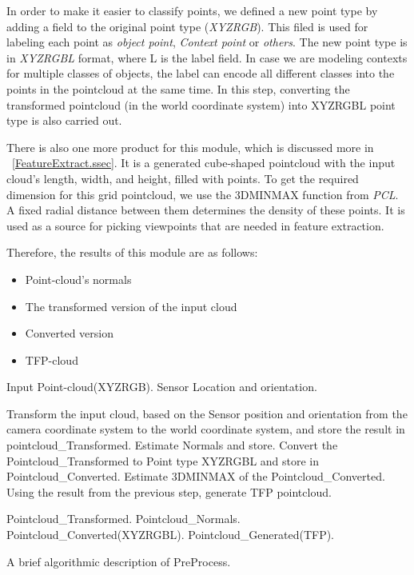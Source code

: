  
 In order to make it easier to classify points, we defined a new point type by adding a field to the original point type ({\it XYZRGB}). This filed is used for labeling each point as {\it object point}, {\it Context point} or {\it others}. The new point type is in {\it XYZRGBL} format, where L is the label field. In case we are modeling contexts for multiple classes of objects, the label can encode all different classes into the points in the pointcloud at the same time. In this step, converting the transformed pointcloud (in the world coordinate system) into XYZRGBL point type is also carried out.
 
 
 There is also one more product for this module, which is discussed more in ~\ref{FeatureExtract.ssec}.
 It is a generated cube-shaped pointcloud with the input cloud's length, width, and height, filled with points. To get the required dimension for this grid pointcloud, we use the 3DMINMAX function from {\it PCL}. A fixed radial distance between them determines the density of these points. It is used as a source for picking viewpoints that are needed in feature extraction.
 
 Therefore, the results of this module are as follows:
 \begin{itemize}
  \item Point-cloud's normals
  \item The transformed version of the input cloud
  \item Converted version
  \item TFP-cloud
 \end{itemize}
 
\begin{algorithm}[t]
\begin{algorithmic}[1]
\REQUIRE Input Point-cloud(XYZRGB).
\REQUIRE Sensor Location and orientation.
\medskip

\STATE Transform the input cloud, based on the Sensor position and orientation from the camera coordinate system to the world coordinate system, and store the result in pointcloud\_Transformed.
\STATE Estimate Normals and store.
\STATE Convert the Pointcloud\_Transformed to Point type XYZRGBL and store in Pointcloud\_Converted.
\STATE Estimate 3DMINMAX of the Pointcloud\_Converted.
\STATE Using the result from the previous step, generate TFP pointcloud.

\medskip
\ENSURE Pointcloud\_Transformed.
\ENSURE Pointcloud\_Normals.
\ENSURE Pointcloud\_Converted(XYZRGBL).
\ENSURE Pointcloud\_Generated(TFP).

\end{algorithmic}
\caption[PreProcess.]
{A brief algorithmic description of PreProcess.}
\label{Preprocess.algorithm}
\end{algorithm}



